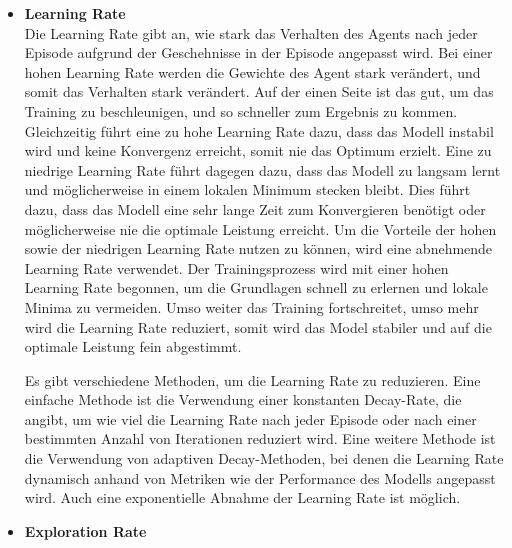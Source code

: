 \begin{itemize}
    \item \textbf{Learning Rate}\\
    Die Learning Rate gibt an, wie stark das Verhalten des Agents nach jeder Episode aufgrund der Geschehnisse in der Episode angepasst wird. Bei einer hohen Learning Rate werden die Gewichte des Agent stark verändert, und somit das Verhalten stark verändert. Auf der einen Seite ist das gut, um das Training zu beschleunigen, und so schneller zum Ergebnis zu kommen. Gleichzeitig führt eine zu hohe Learning Rate dazu, dass das Modell instabil wird und keine Konvergenz erreicht, somit nie das Optimum erzielt. Eine zu niedrige Learning Rate führt dagegen dazu, dass das Modell zu langsam lernt und möglicherweise in einem lokalen Minimum stecken bleibt. Dies führt dazu, dass das Modell eine sehr lange Zeit zum Konvergieren benötigt oder möglicherweise nie die optimale Leistung erreicht. Um die Vorteile der hohen sowie der niedrigen Learning Rate nutzen zu können, wird eine abnehmende Learning Rate verwendet. Der Trainingsprozess wird mit einer hohen Learning Rate begonnen, um die Grundlagen schnell zu erlernen und lokale Minima zu vermeiden. Umso weiter das Training fortschreitet, umso mehr wird die Learning Rate reduziert, somit wird das Model stabiler und auf die optimale Leistung fein abgestimmt.

    Es gibt verschiedene Methoden, um die Learning Rate zu reduzieren. Eine einfache Methode ist die Verwendung einer konstanten Decay-Rate, die angibt, um wie viel die Learning Rate nach jeder Episode oder nach einer bestimmten Anzahl von Iterationen reduziert wird. Eine weitere Methode ist die Verwendung von adaptiven Decay-Methoden, bei denen die Learning Rate dynamisch anhand von Metriken wie der Performance des Modells angepasst wird. Auch eine exponentielle Abnahme der Learning Rate ist möglich.
    \item \textbf{Exploration Rate }\\

\end{itemize}
